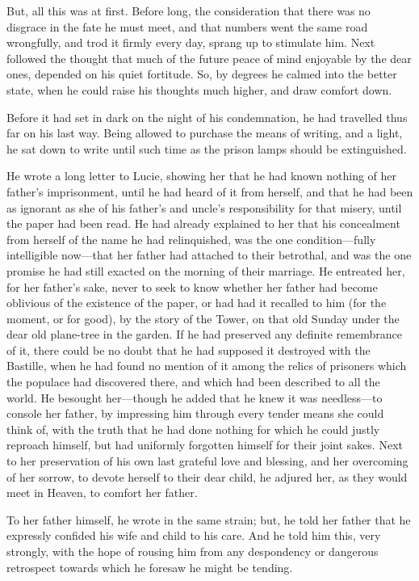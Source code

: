 But, all this was at first.  Before long, the consideration that
there was no disgrace in the fate he must meet, and that numbers went
the same road wrongfully, and trod it firmly every day, sprang up to
stimulate him.  Next followed the thought that much of the future
peace of mind enjoyable by the dear ones, depended on his quiet
fortitude.  So, by degrees he calmed into the better state, when he
could raise his thoughts much higher, and draw comfort down.

Before it had set in dark on the night of his condemnation, he had
travelled thus far on his last way.  Being allowed to purchase the
means of writing, and a light, he sat down to write until such time
as the prison lamps should be extinguished.

He wrote a long letter to Lucie, showing her that he had known
nothing of her father's imprisonment, until he had heard of it from
herself, and that he had been as ignorant as she of his father's and
uncle's responsibility for that misery, until the paper had been read.
He had already explained to her that his concealment from herself of
the name he had relinquished, was the one condition---fully
intelligible now---that her father had attached to their betrothal,
and was the one promise he had still exacted on the morning of their
marriage.  He entreated her, for her father's sake, never to seek to
know whether her father had become oblivious of the existence of the
paper, or had had it recalled to him (for the moment, or for good),
by the story of the Tower, on that old Sunday under the dear old
plane-tree in the garden.  If he had preserved any definite remembrance
of it, there could be no doubt that he had supposed it destroyed with
the Bastille, when he had found no mention of it among the relics of
prisoners which the populace had discovered there, and which had been
described to all the world.  He besought her---though he added that he
knew it was needless---to console her father, by impressing him
through every tender means she could think of, with the truth that he
had done nothing for which he could justly reproach himself, but had
uniformly forgotten himself for their joint sakes.  Next to her
preservation of his own last grateful love and blessing, and her
overcoming of her sorrow, to devote herself to their dear child,
he adjured her, as they would meet in Heaven, to comfort her father.

To her father himself, he wrote in the same strain; but, he told her
father that he expressly confided his wife and child to his care.
And he told him this, very strongly, with the hope of rousing him
from any despondency or dangerous retrospect towards which he foresaw
he might be tending.

